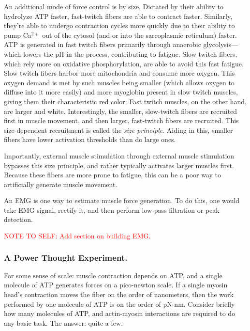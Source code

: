 An additional mode of force control is by size. Dictated by their ability to hydrolyze ATP faster, fast-twitch fibers are able to contract faster. Similarly, they're able to undergo contraction cycles more quickly due to their ability to pump Ca$^{2+}$ out of the cytosol (and or into the sarcoplasmic reticulum) faster. ATP is generated in fast twitch fibers primarily through anaerobic glycolysis---which lowers the pH in the process, contributing to fatigue. Slow twitch fibers, which rely more on oxidative phosphorylation, are able to avoid this fast fatigue. Slow twitch fibers harbor more mitochondria and consume more oxygen. This oxygen demand is met by such muscles being smaller (which allows oxygen to diffuse into it more easily) and more myoglobin present in slow twitch muscles, giving them their characteristic red color. Fast twitch muscles, on the other hand, are larger and white. Interestingly, the smaller, slow-twitch fibers are recruited first in muscle movement, and then larger, fast-twitch fibers are recruited. This size-dependent recruitment is called the \textit{size principle}. Aiding in this, smaller fibers have lower activation thresholds than do large ones. \newline

Importantly, external muscle stimulation through external muscle stimulation bypasses this size principle, and rather typically activates larger muscles first. Because these fibers are more prone to fatigue, this can be a poor way to artificially generate muscle movement.\newline

An EMG is one way to estimate muscle force generation. To do this, one would take EMG signal, rectify it, and then perform low-pass filtration or peak detection.\newline

\textcolor{red}{NOTE TO SELF: Add section on building EMG.}


\subsubsection{A Power Thought Experiment.}

For some sense of scale: muscle contraction depends on ATP, and a single molecule of ATP generates forces on a pico-newton scale. If a single myosin head's contraction moves the fiber on the order of nanometers, then the work performed by one molecule of ATP is on the order of pN-nm. Consider briefly how many molecules of ATP, and actin-myosin interactions are required to do any basic task. The answer: quite a few. 


